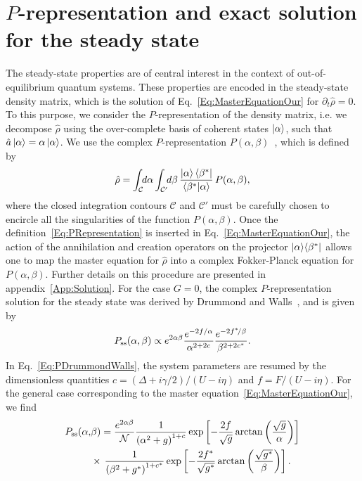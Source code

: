 \section{$P$-representation and exact solution for the steady state}\label{Sec:Solution}
The steady-state properties are of central interest in the context of out-of-equilibrium quantum systems. These properties are encoded in the steady-state density matrix, which is the solution of Eq.~\eqref{Eq:MasterEquationOur} for $\partial_t\hat{\rho}=0$.
To this purpose, we consider the $P$-representation of the density matrix, i.e. we decompose $\hat{\rho}$ using the over-complete basis of coherent states $\ket{\alpha}$, such that ${\hat{a}}\ket{\alpha}=\alpha\ket{\alpha}$.
We use the complex $P$-representation $P(\alpha,\beta)$~\cite{DrummondJPA80b}, which is defined by
\begin{equation}\label{Eq:PRepresentation}
\hat{\rho}=\int_\mathcal{C}\!\!d\alpha \int_{\mathcal{C}'}\!\!d\beta\,
\frac{\ket{\alpha}\bra{\beta^*}}{\braket{\beta^*|\alpha}}\,
P(\alpha,\beta),
\end{equation}
where the closed integration contours $\mathcal{C}$ and $\mathcal{C}'$ must be carefully chosen to encircle all the singularities of the function $P(\alpha,\beta)$.
Once the definition~\eqref{Eq:PRepresentation} is inserted in Eq.~\eqref{Eq:MasterEquationOur}, the action of the annihilation and creation operators on the projector $\ket{\alpha}\!\bra{\beta^*}$ allows one to map the master equation for $\hat{\rho}$ into a complex Fokker-Planck equation for $P(\alpha,\beta)$. Further details on this procedure are presented in appendix~\ref{App:Solution}.
For the case $G=0$, the complex $P$-representation solution for the steady state was derived by Drummond and Walls~\cite{DrummondJPA80a}, and is given by
\begin{equation}\label{Eq:PDrummondWalls}
P_{\rm ss}(\alpha,\beta)\propto e^{2\alpha\beta}
\frac{e^{-2f/\alpha}}{\alpha^{2+2c}}
\frac{e^{-2f^*\!/\beta}}{\beta^{2+2c^*}}.
\end{equation}
In Eq.~\eqref{Eq:PDrummondWalls}, the system parameters are resumed by the dimensionless quantities \mbox{$c=(\Delta+i\gamma/2)/(U-i\eta)$} and \mbox{$f=F/(U-i\eta)$}.
For the general case corresponding to the master equation~\eqref{Eq:MasterEquationOur}, we find
\begin{equation}\label{Eq:PRepOur}
\begin{split}
P_{\rm ss}(\alpha,&\beta)=\frac{
	e^{2\alpha\beta}}{{\mathcal{N}}}
\frac{1}{\left(\alpha^2+g\right)^{1+c}}
\exp\left[-\frac{2f}{\sqrt{g}}\arctan\left(\frac{\sqrt{g}}{\alpha}\right)\right]\\
&\times\,\frac{1}{\left(\beta^2+g^*\right)^{1+c^*}}
\exp\left[-\frac{2f^*}{\sqrt{g^*}}\arctan\left(\frac{\sqrt{g^*}}{\beta}\right)\right].
\end{split}
\end{equation}
